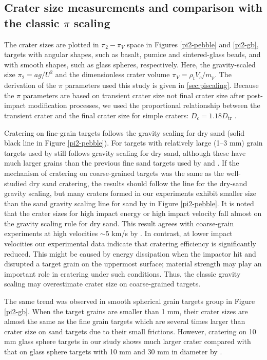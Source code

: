 \documentclass[3p,authoryear]{elsarticle}
\begin{document}
 \subsection{Crater size measurements and comparison with the classic $\pi$ scaling} \label{sec: classic pi}
The crater sizes are plotted in $\pi_2-\pi_V$ space \citep[e.g.][]{holsapple1993} in Figures \ref{pi2-pebble} and \ref{pi2-gb}, targets with angular shapes, such as basalt, pumice and sintered-glass beads, and with smooth shapes, such as glass spheres, respectively.
Here, the gravity-scaled size $\pi_2=ag/ U^2$ and the dimensionless crater volume $\pi_V=\rho_t V_c/m_p$.
The derivation of the $\pi$ parameters used this study is given in \ref{sec:piscaling}.
Because the $\pi$ parameters are based on transient crater size not final crater size after post-impact modification processes, we used the proportional relationship between the transient crater and the final crater size for simple craters: $D_c=1.18D_\text{tr}$ \citep{chapman1986,melosh1989}.

Cratering on fine-grain targets \citep{schmidt1980,mizutani1983,cintala1999} follows the gravity scaling for dry sand (solid black line in Figure \ref{pi2-pebble}).
For targets with relatively large (1--3 mm) grain targets used by \citet{cintala1999} still follows gravity scaling for dry sand, although these have much larger grains than the previous fine sand targets used by \citet{schmidt1980} and \citet{mizutani1983}.
If the mechanism of cratering on coarse-grained targets was the same as the well-studied dry sand cratering, the results should follow the line for the dry-sand gravity scaling, but many craters formed in our experiments exhibit smaller size than the sand gravity scaling line for sand by \citet{schmidt1987} in Figure \ref{pi2-pebble}.
It is noted that the crater sizes for high impact energy or high impact velocity fall almost on the gravity scaling rule for dry sand.
This result agrees with coarse-grain experiments at high velocities $\sim 5$ km/s by \citet{holsapple2014}.
In contrast, at lower impact velocities our experimental data indicate that cratering efficiency is significantly reduced.
This might be caused by energy dissipation when the impactor hit and disrupted a target grain on the uppermost surface; material strength may play an important role in cratering under such conditions.
Thus, the classic gravity scaling may overestimate crater size on coarse-grained targets.

The same trend was observed in smooth spherical grain targets group in Figure \ref{pi2-gb}.
When the target grains are smaller than 1 mm, their crater sizes are almost the same as the fine grain targets which are several times larger than crater size on sand targets due to their small frictions.
However, cratering on 10 mm glass sphere targets in our study shows much larger crater compared with that on glass sphere targets with 10 mm and 30 mm in diameter by \citet{guettler2012}.
\end{document}
